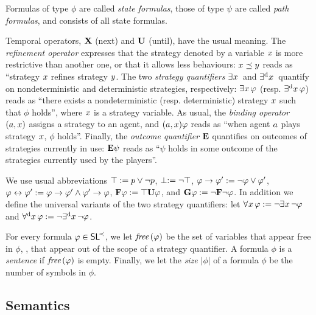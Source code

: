 Formulas of type $\phi$ are called \emph{state formulas}, those of type $\psi$
are called \emph{path formulas}, and \SLref consists of all state formulas.


Temporal operators, ${\bf X}$ (next) and
 ${\bf U}$ (until), have the usual meaning. The \emph{refinement
   operator} expresses that the strategy denoted by a variable $x$ is more
 restrictive than another one, or that it allows less behaviours: $x\preceq y$ reads as ``strategy
 $x$ refines strategy $y$. The two \emph{strategy
   quantifiers}  $\exists^{} x\,$ and $\exists^{\text{d}} x\,$ quantify on nondeterministic
 and deterministic strategies, respectively: $\exists^{} x\,\varphi$
 (resp. $\exists^{\text{d}} x\,\varphi$) reads as ``there exists a nondeterministic
 (resp. deterministic) strategy $x$
  such that $\phi$
 holds'', where $x$ is a strategy variable. 
As usual, the \emph{binding operator} $(a,x)$ assigns a strategy to an
 agent, and $(a,x)\varphi$ reads as ``when agent $a$ plays strategy $x$,
 $\phi$ holds''.
Finally, the \emph{outcome quantifier} ${\bf E}$ quantifies on
   outcomes of strategies currently in use: ${\bf E}\psi$ reads as ``$\psi$
 holds in some
 outcome of the strategies currently used by the players''.

We use usual abbreviations $\top:= p\vee\neg p$, $\perp:=\neg\top$, $\varphi\to\varphi':= \neg \varphi \vee \varphi'$,
$\varphi\leftrightarrow\varphi':= \varphi\to\varphi'\wedge \varphi'\to\varphi$,
 ${\bf F}\varphi := \top {\bf U} \varphi$,  and ${\bf G}\varphi := \neg {\bf F}
\neg \varphi$. In addition we
define the universal variants of the two strategy quantifiers:  let
 $\forall^{} x\,\varphi:=\neg\exists^{} x\,\neg\varphi$ and $\forall^{\text{d}} x\,\varphi:=\neg\exists^{\text{d}} x\,\neg\varphi$.

For every formula $\varphi\in\textnormal{{\sffamily SL}}^{\!\prec}$, we let  $\textit{free}\,(\varphi)$ be the set of variables that appear
free in $\phi$, \ie, that
appear out of the scope of a strategy quantifier. A formula $\phi$ is a \emph{sentence} if $\textit{free}\,(\varphi)$ is empty.
Finally, we let the \emph{size} $|\phi|$ of a formula $\phi$ be the
number of symbols in $\phi$.


\subsection{Semantics}
\label{sec-SLmodels}

